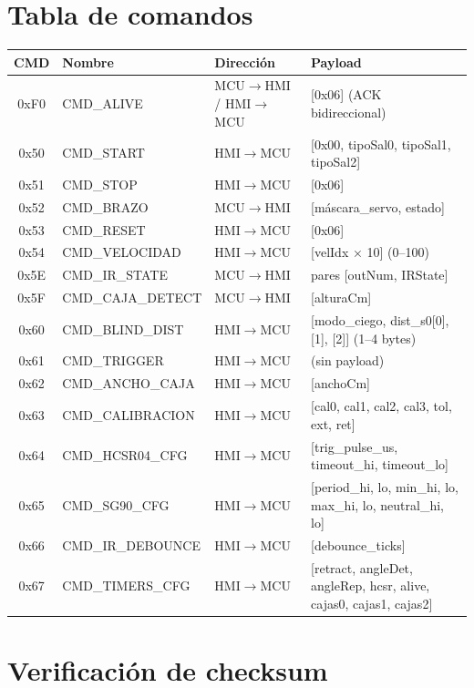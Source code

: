 \documentclass[12pt,a4paper]{report}
\begin{document}
\section{Tabla de comandos}

\begin{longtable}{cllp{6cm}}
  \toprule
  \textbf{CMD} & \textbf{Nombre} & \textbf{Dirección} & \textbf{Payload} \\
  \midrule
  \endhead
  0xF0 & CMD\_ALIVE & MCU$\to$HMI / HMI$\to$MCU & [0x06] (ACK bidireccional) \\
  \midrule
  0x50 & CMD\_START & HMI$\to$MCU & [0x00, tipoSal0, tipoSal1, tipoSal2] \\
  0x51 & CMD\_STOP  & HMI$\to$MCU & [0x06] \\
  0x52 & CMD\_BRAZO & MCU$\to$HMI & [máscara\_servo, estado] \\
  0x53 & CMD\_RESET & HMI$\to$MCU & [0x06] \\
  0x54 & CMD\_VELOCIDAD & HMI$\to$MCU & [velIdx × 10] (0–100) \\
  \midrule
  0x5E & CMD\_IR\_STATE  & MCU$\to$HMI & pares [outNum, IRState] \\
  0x5F & CMD\_CAJA\_DETECT & MCU$\to$HMI & [alturaCm] \\
  \midrule
  0x60 & CMD\_BLIND\_DIST & HMI$\to$MCU & [modo\_ciego, dist\_s0[0], [1], [2]] (1–4 bytes) \\
  0x61 & CMD\_TRIGGER & HMI$\to$MCU & (sin payload) \\
  0x62 & CMD\_ANCHO\_CAJA & HMI$\to$MCU & [anchoCm] \\
  0x63 & CMD\_CALIBRACION & HMI$\to$MCU & [cal0, cal1, cal2, cal3, tol, ext, ret] \\
  0x64 & CMD\_HCSR04\_CFG & HMI$\to$MCU & [trig\_pulse\_us, timeout\_hi, timeout\_lo] \\
  0x65 & CMD\_SG90\_CFG & HMI$\to$MCU & [period\_hi, lo, min\_hi, lo, max\_hi, lo, neutral\_hi, lo] \\
  0x66 & CMD\_IR\_DEBOUNCE & HMI$\to$MCU & [debounce\_ticks] \\
  0x67 & CMD\_TIMERS\_CFG & HMI$\to$MCU & [retract, angleDet, angleRep, hcsr, alive, cajas0, cajas1, cajas2] \\
  \bottomrule
\end{longtable}

\section{Verificación de checksum}
\end{document}
